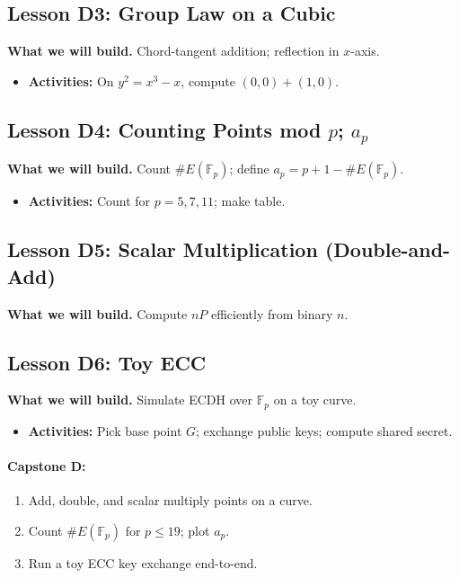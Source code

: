 \documentclass[11pt]{article}
\begin{document}
\subsection*{Lesson D3: Group Law on a Cubic}
\textbf{What we will build.} Chord-tangent addition; reflection in $x$-axis.
\begin{itemize}
\item \textbf{Activities:} On $y^2=x^3-x$, compute $(0,0)+(1,0)$.
\end{itemize}

\subsection*{Lesson D4: Counting Points mod $p$; $a_p$}
\textbf{What we will build.} Count $\#E(\mathbb{F}_p)$; define $a_p=p+1-\#E(\mathbb{F}_p)$.
\begin{itemize}
\item \textbf{Activities:} Count for $p=5,7,11$; make table.
\end{itemize}

\subsection*{Lesson D5: Scalar Multiplication (Double-and-Add)}
\textbf{What we will build.} Compute $nP$ efficiently from binary $n$.

\subsection*{Lesson D6: Toy ECC}
\textbf{What we will build.} Simulate ECDH over $\mathbb{F}_p$ on a toy curve.
\begin{itemize}
\item \textbf{Activities:} Pick base point $G$; exchange public keys; compute shared secret.
\end{itemize}

\paragraph{Capstone D:}
\begin{enumerate}
\item Add, double, and scalar multiply points on a curve.
\item Count $\#E(\mathbb{F}_p)$ for $p\le 19$; plot $a_p$.
\item Run a toy ECC key exchange end-to-end.
\end{enumerate}
\end{document}
